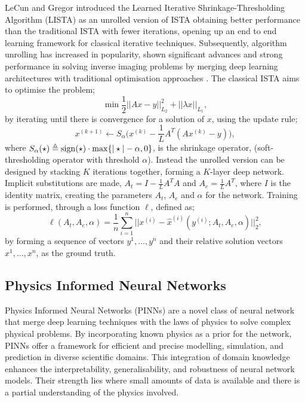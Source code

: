 \IEEEPARstart{}{} LeCun and Gregor introduced the Learned Iterative Shrinkage-Thresholding Algorithm (LISTA) as an unrolled version of ISTA \cite{gregor2010learning} obtaining better performance than the traditional ISTA with fewer iterations, opening up an end to end learning framework for classical iterative techniques. Subsequently, algorithm unrolling has increased in popularity, shown significant advances and strong performance in solving inverse imaging problems by merging deep learning architectures with traditional optimisation approaches \cite{monga2021algorithm,yang2016deep, diamond2017unrolled}. The classical ISTA aims to optimise the problem;
\begin{equation}
\min \frac{1}{2} ||Ax - y||^2_{L_2} + ||\lambda x||_{L_1}, 
\end{equation}
by iterating until there is convergence for a solution of $x$, using the update rule;
\begin{equation}
	x^{(k+1)} \leftarrow S_{\alpha} \Big(x^{(k)} - \frac{1}{L} A^T(A x^{(k)} - y)\Big),
\end{equation}
where $S_{\alpha}(\star) \triangleq \operatorname*{\mathrm{sign}}(\star) \cdot \max \{|\star| - \alpha, 0\}$, is the shrinkage operator, (soft-thresholding operator with threshold $\alpha$). Instead the unrolled version can be designed by stacking $K$ iterations together, forming a $K$-layer deep network. Implicit substitutions are made, $A_t = I - \frac{1}{L}A^T A$ and $A_e = \frac{1}{L}A^T$, where $I$ is the identity matrix, creating the parameters $A_t$, $A_e$ and $\alpha$ for the network. Training is performed, through a loss function $\ell$, defined as;
\begin{equation}
	\ell(A_t, A_e, \alpha) = \frac{1}{n} \sum_{i=1}^{n} \big|\big|x^{(i)} - \hat{x}^{(i)}(y^{(i)};A_t,A_e,\alpha)\big|\big|^2_2,
\end{equation}
by forming a sequence of vectors $y^{1}, \dots, y^{n}$ and their relative solution vectors $x^1, \dots, x^n$, as the ground truth. 

\subsection{Physics Informed Neural Networks}

\IEEEPARstart{}{} Physics Informed Neural Networks (PINNs) are a novel class of neural network that merge deep learning techniques with the laws of physics to solve complex physical problems. By incorporating known physics as a prior for the network, PINNs offer a framework for efficient and precise modelling, simulation, and prediction in diverse scientific domains. This integration of domain knowledge enhances the interpretability, generalisability, and robustness of neural network models. Their strength lies where small amounts of data is available and there is a partial understanding of the physics involved.  

